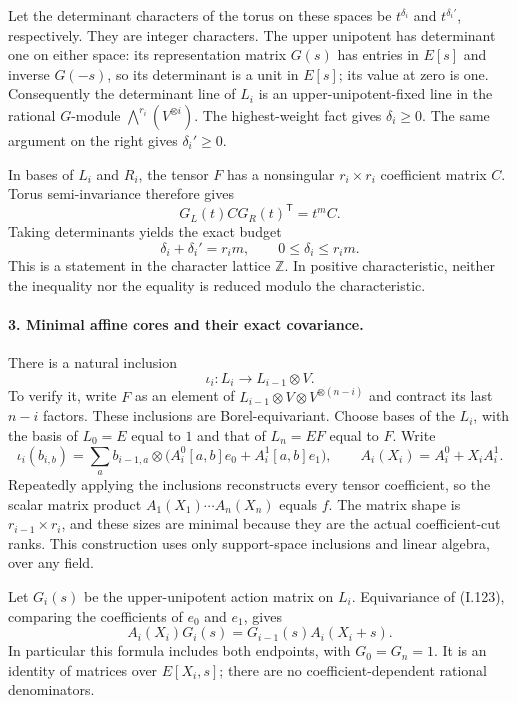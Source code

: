 Let the determinant characters of the torus on these spaces be
$t^{\delta_i}$ and $t^{\delta_i'}$, respectively. They are integer
characters. The upper unipotent has determinant one on either
space: its representation matrix $G(s)$ has entries in $E[s]$
and inverse $G(-s)$, so its determinant is a unit in $E[s]$;
its value at zero is one. Consequently the determinant line of
$L_i$ is an upper-unipotent-fixed line in the rational
$G$-module $\bigwedge^{r_i}(V^{\otimes i})$. The highest-weight
fact gives $\delta_i\ge0$. The same argument on the right gives
$\delta_i'\ge0$.

In bases of $L_i$ and $R_i$, the tensor $F$ has a nonsingular
$r_i\times r_i$ coefficient matrix $C$. Torus semi-invariance
therefore gives
\[
 G_L(t) C G_R(t)^{\mathsf T}=t^m C.
\]
Taking determinants yields the exact budget
\[
 \delta_i+\delta_i'=r_i m,
 \qquad 0\le\delta_i\le r_i m.
 \tag{I.122}
\]
This is a statement in the character lattice $\mathbb Z$.
In positive characteristic, neither the inequality nor the
equality is reduced modulo the characteristic.

\paragraph{3. Minimal affine cores and their exact covariance.}
There is a natural inclusion
\[
 \iota_i:L_i\longrightarrow L_{i-1}\otimes V.
\]
To verify it, write $F$ as an element of
$L_{i-1}\otimes V\otimes V^{\otimes(n-i)}$ and contract its last
$n-i$ factors. These inclusions are Borel-equivariant. Choose
bases of the $L_i$, with the basis of $L_0=E$ equal to $1$ and
that of $L_n=EF$ equal to $F$. Write
\[
 \iota_i(b_{i,b})
   =\sum_a b_{i-1,a}\otimes
       \bigl(A_i^0[a,b]e_0+A_i^1[a,b]e_1\bigr),
 \qquad A_i(X_i)=A_i^0+X_iA_i^1.
 \tag{I.123}
\]
Repeatedly applying the inclusions reconstructs every tensor
coefficient, so the scalar matrix product
$A_1(X_1)\cdots A_n(X_n)$ equals $f$. The matrix shape is
$r_{i-1}\times r_i$, and these sizes are minimal because they
are the actual coefficient-cut ranks. This construction uses
only support-space inclusions and linear algebra, over any
field.

Let $G_i(s)$ be the upper-unipotent action matrix on $L_i$.
Equivariance of (I.123), comparing the coefficients of $e_0$
and $e_1$, gives
\[
 A_i(X_i)G_i(s)=G_{i-1}(s)A_i(X_i+s).
 \tag{I.124}
\]
In particular this formula includes both endpoints, with
$G_0=G_n=1$. It is an identity of matrices over $E[X_i,s]$;
there are no coefficient-dependent rational denominators.

